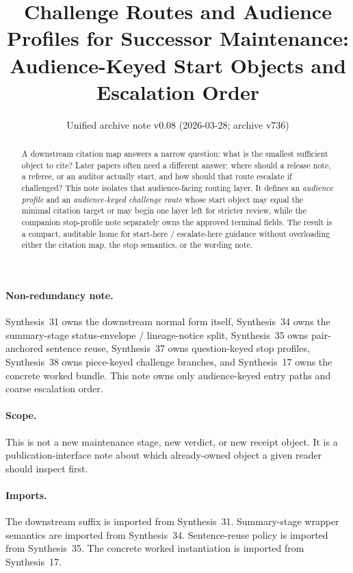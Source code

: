 \documentclass[11pt]{article}
\title{Challenge Routes and Audience Profiles for Successor Maintenance:\\[0.5ex]
\large Audience-Keyed Start Objects and Escalation Order}
\author{}
\date{Unified archive note v0.08 (2026-03-28; archive v736)}
\begin{document}
\maketitle

\begin{abstract}
A downstream citation map answers a narrow question: what is the smallest sufficient object to cite?
Later papers often need a different answer: where should a release note, a referee, or an auditor actually start, and how should that route escalate if challenged?
This note isolates that audience-facing routing layer.
It defines an \emph{audience profile} and an \emph{audience-keyed challenge route} whose start object may equal the minimal citation target or may begin one layer left for stricter review, while the companion stop-profile note separately owns the approved terminal fields.
The result is a compact, auditable home for start-here / escalate-here guidance without overloading either the citation map, the stop semantics, or the wording note.
\end{abstract}

\paragraph{Non-redundancy note.}
Synthesis~31 owns the downstream normal form itself, Synthesis~34 owns the summary-stage status-envelope / lineage-notice split, Synthesis~35 owns pair-anchored sentence reuse, Synthesis~37 owns question-keyed stop profiles, Synthesis~38 owns piece-keyed challenge branches, and Synthesis~17 owns the concrete worked bundle. This note owns only audience-keyed entry paths and coarse escalation order.

\paragraph{Scope.}
This is not a new maintenance stage, new verdict, or new receipt object. It is a publication-interface note about which already-owned object a given reader should inspect first.

\paragraph{Imports.}
The downstream suffix is imported from Synthesis~31.\cite{series:downstreamnormalforms}
Summary-stage wrapper semantics are imported from Synthesis~34.\cite{series:statusenvelopes}
Sentence-reuse policy is imported from Synthesis~35.\cite{series:sentencelocks}
The concrete worked instantiation is imported from Synthesis~17.\cite{series:workedexample}
\end{document}
